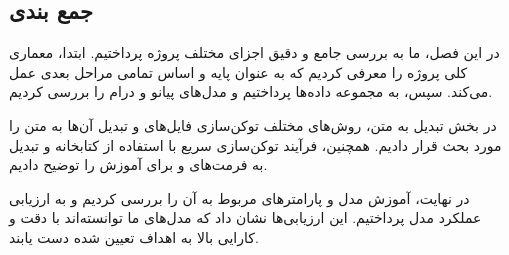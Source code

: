 \subsection{جمع بندی}
در این فصل، ما به بررسی جامع و دقیق اجزای مختلف پروژه پرداختیم. ابتدا، معماری کلی پروژه را معرفی کردیم که به عنوان پایه و اساس تمامی مراحل بعدی عمل می‌کند. سپس، به مجموعه داده‌ها پرداختیم و مدل‌های پیانو و درام را بررسی کردیم.

در بخش تبدیل  به متن، روش‌های مختلف توکن‌سازی فایل‌های  و تبدیل آن‌ها به متن را مورد بحث قرار دادیم. همچنین، فرآیند توکن‌سازی سریع با استفاده از کتابخانه  و تبدیل به فرمت‌های  و  برای آموزش را توضیح دادیم.

در نهایت، آموزش مدل و پارامترهای مربوط به آن را بررسی کردیم و به ارزیابی عملکرد مدل پرداختیم. این ارزیابی‌ها نشان داد که مدل‌های ما توانسته‌اند با دقت و کارایی بالا به اهداف تعیین شده دست یابند.